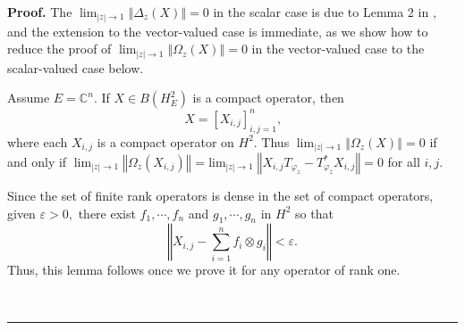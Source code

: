 \documentclass{article}%
\newenvironment{proof}[1][Proof]{\noindent\textbf{#1.} }{\ \rule{0.5em}{0.5em}}
\begin{document}
\begin{proof}
The $\lim_{\left\vert z\right\vert \rightarrow1}\left\Vert \Delta
_{z}(X)\right\Vert =0$ in the scalar case is due to Lemma 2 in \cite{Zheng},
and the extension to the vector-valued case is immediate, as we show how to
reduce the proof of $\lim_{\left\vert z\right\vert \rightarrow1}\left\Vert
\Omega_{z}(X)\right\Vert =0$ in the vector-valued case to the scalar-valued
case below.

Assume $E=\mathbb{C}^{n}.$ If $X\in B(H_{E}^{2})$ is a compact operator, then
\[
X=\left[  X_{i,j}\right]  _{i,j=1}^{n}\text{,}%
\]
where each $X_{i,j}$ is a compact operator on $H^{2}$. Thus $\lim_{\left\vert
z\right\vert \rightarrow1}\left\Vert \Omega_{z}(X)\right\Vert =0$ if and only
if $\lim_{\left\vert z\right\vert \rightarrow1}$$\left\Vert \Omega_{z}%
(X_{i,j})\right\Vert $ =$\lim_{\left\vert z\right\vert \rightarrow1}\left\Vert
X_{i,j}T_{\varphi_{z}}-T_{\varphi_{\overline{z}}}^{\ast}X_{i,j}\right\Vert =0$
for all $i,j$.

Since the set of finite rank operators is dense in the set of compact
operators, given $\varepsilon>0,$ there exist $f_{1},\cdots,f_{n}$ and
$g_{1},\cdots,g_{n}$ in $H^{2}$ so that
\[
\left\Vert X_{i,j}-\sum_{i=1}^{n}f_{i}\otimes g_{i}\right\Vert <\varepsilon.
\]
Thus, this lemma follows once we prove it for any operator of rank one.


\end{proof}
\end{document}
